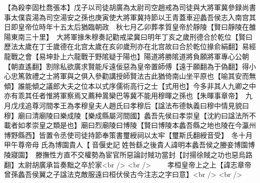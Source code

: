 【為殺李固杜喬張本】戊子以司徒胡廣為太尉司空趙戒為司徒與大將軍冀參録尚書事太僕袁湯為司空湯安之孫也庚寅使大將軍冀持節以王青蓋車迎蠡吾侯志入南宫其日即皇帝位時年十五太后猶臨朝政　秋七月乙卯葬孝質皇帝於靜陵【賢曰靜陵在雒陽東南三十里】　大將軍掾朱穆奏記勸戒梁冀曰明年丁亥之歲刑德合於乾位【賢曰歷法太歲在丁壬歲德在北宫太歲在亥卯歲刑亦在北宫故曰合於乾位掾俞絹翻】易經龍戰之會【易坤卦上六龍戰于野隂疑于陽也】陽道將勝隂道將負願將軍專心公朝【朝直遙翻】割除私欲廣求賢能斥遠佞惡為皇帝置師傅【遠于願翻為于偽翻】得小心忠篤敦禮之士將軍與之俱入參勸講授師賢法古此猶倚南山坐平原也【喻其安而無傾】誰能傾之議郎大夫之位本以式序儒術高行之士【式用也】今多非其人九卿之中亦有乖其任者惟將軍察焉又薦种暠欒巴等冀不能用穆暉之孫也【朱暉事章帝】　九月戊戌追尊河間孝王為孝穆皇夫人趙氏曰孝穆后【諡法布德執義曰穆中情見貌曰穆】廟曰清廟陵曰樂成陵【樂成縣屬河間國】蠡吾先侯曰孝崇皇【沈約曰諡法所不載者如孝崇皇之類是也】廟曰烈廟陵曰博陵【賢曰博陵本蠡吾縣之地也陵在今瀛州博野縣西】皆置令丞使司徒持節奉策書璽綬祠以太牢【璽斯氏翻綬音受】　冬十月甲午尊帝母氏為博園貴人【音偃史記姓咎繇之後貴人諱明本蠡吾侯之媵妾博園博陵寢園】　滕撫性方直不交權勢為宦官所惡論討賊功當封【討揚徐賊之功也惡烏路翻】太尉胡廣承旨奏黜之卒於家<br />
<br />
　　孝桓皇帝上之上【諱志章帝曾孫蠡吾侯翼之子諡法克敵服遠曰桓伏侯古今注志之字曰意】<br />
<br />
